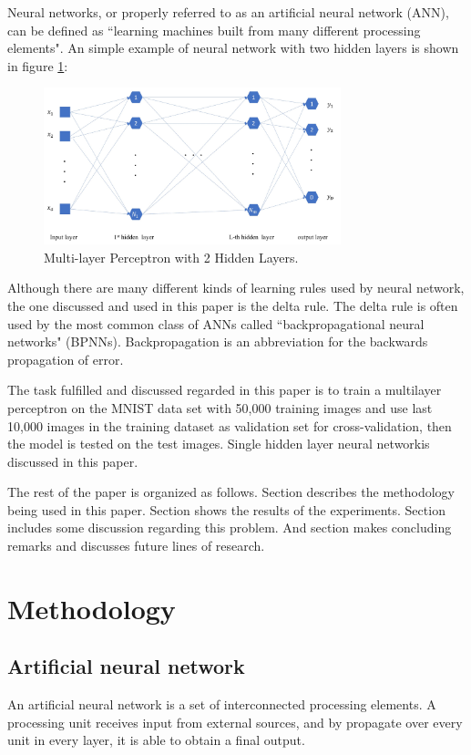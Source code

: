 \documentclass[conference]{IEEEtran}
\begin{document}
Neural networks, or properly referred to as an artificial neural network (ANN), can be defined as ``learning machines built from many different processing elements"\cite{b2}. An simple example of neural network with two hidden layers is shown in figure \ref{ANN}:
\begin{figure}[htbp]
\centerline{\includegraphics[width=3.4in]{annBlock.jpg}}
\caption{Multi-layer Perceptron with 2 Hidden Layers.}
\label{ANN}
\end{figure}

Although there are many different kinds of learning rules used by neural network, the one discussed and used in this paper is the delta rule. The delta rule is often used by the most common class of ANNs called ``backpropagational neural networks" (BPNNs). Backpropagation is an abbreviation for the backwards propagation of error.

The task fulfilled and discussed regarded in this paper is to train a multilayer perceptron on the MNIST data set with 50,000 training images and use last 10,000 images in the training dataset as validation set for cross-validation, then the model is tested on the test images. Single hidden layer neural networkis discussed in this paper. 

The rest of the paper is organized as follows. Section \uppercase\expandafter{} describes the methodology being used in this paper. Section  \uppercase\expandafter{} shows the results of the experiments. Section  \uppercase\expandafter{} includes some discussion regarding this problem. And section \uppercase\expandafter{} makes concluding remarks and discusses future lines of research.

\section{Methodology}
\subsection{Artificial neural network} An artificial neural network is a set of interconnected processing elements. A processing unit receives input from external sources, and by propagate over every unit in every layer, it is able to obtain a final output.
\end{document}
